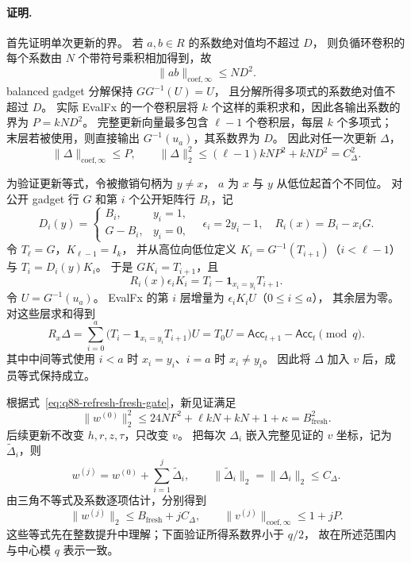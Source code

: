 \paragraph{证明.}
首先证明单次更新的界。
若 $a,b\in R$ 的系数绝对值均不超过 $D$，
则负循环卷积的每个系数由 $N$ 个带符号乘积相加得到，故
\[
 \|ab\|_{\mathrm{coef},\infty}\le ND^2.
\]
balanced gadget 分解保持 $GG^{-1}(U)=U$，
且分解所得多项式的系数绝对值不超过 $D$。
实际 EvalFx 的一个卷积层将 $k$ 个这样的乘积求和，因此各输出系数的界为
$P=kND^2$。
完整更新向量最多包含 $\ell-1$ 个卷积层，每层 $k$ 个多项式；
末层若被使用，则直接输出 $G^{-1}(u_a)$，其系数界为 $D$。
因此对任一次更新 $\Delta$，
\[
 \|\Delta\|_{\mathrm{coef},\infty}\le P,
 \qquad
 \|\Delta\|_2^2\le(\ell-1)kNP^2+kND^2=C_{\Delta}^2.
\]

为验证更新等式，令被撤销句柄为 $y\ne x$，
$a$ 为 $x$ 与 $y$ 从低位起首个不同位。
对公开 gadget 行 $G$ 和第 $i$ 个公开矩阵行 $B_i$，记
\[
 D_i(y)=\begin{cases}B_i,&y_i=1,\\G-B_i,&y_i=0,\end{cases}
 \quad \epsilon_i=2y_i-1,\quad R_i(x)=B_i-x_iG.
\]
令 $T_{\ell}=G$，$K_{\ell-1}=I_k$，
并从高位向低位定义
$K_i=G^{-1}(T_{i+1})$（$i<\ell-1$）与 $T_i=D_i(y)K_i$。
于是 $GK_i=T_{i+1}$，且
\[
 R_i(x)\epsilon_iK_i
 =T_i-\boldsymbol{1}_{x_i=y_i}T_{i+1}.
\]
令 $U=G^{-1}(u_a)$。
EvalFx 的第 $i$ 层增量为 $\epsilon_iK_iU$（$0\le i\le a$），
其余层为零。对这些层求和得到
\begin{equation}
 R_x\Delta
 =\sum_{i=0}^{a}
   \bigl(T_i-\boldsymbol{1}_{x_i=y_i}T_{i+1}\bigr)U
 =T_0U
 =\mathsf{Acc}_{t+1}-\mathsf{Acc}_t\pmod q.
 \label{eq:q88-refresh-update-identity}
\end{equation}
其中中间等式使用 $i<a$ 时 $x_i=y_i$、$i=a$ 时 $x_i\ne y_i$。
因此将 $\Delta$ 加入 $v$ 后，成员等式保持成立。

根据式~\eqref{eq:q88-refresh-fresh-gate}，新见证满足
\[
 \|w^{(0)}\|_2^2
 \le24NF^2+\ell kN+kN+1+\kappa
 =B_{\mathrm{fresh}}^2.
\]
后续更新不改变 $h,r,z,\tau$，只改变 $v$。
把每次 $\Delta_i$ 嵌入完整见证的 $v$ 坐标，记为
$\widetilde\Delta_i$，则
\[
 w^{(j)}=w^{(0)}+\sum_{i=1}^{j}\widetilde\Delta_i,
 \qquad \|\widetilde\Delta_i\|_2=\|\Delta_i\|_2\le C_{\Delta}.
\]
由三角不等式及系数逐项估计，分别得到
\[
 \|w^{(j)}\|_2\le B_{\mathrm{fresh}}+jC_{\Delta},
 \qquad
 \|v^{(j)}\|_{\mathrm{coef},\infty}\le1+jP.
\]
这些等式先在整数提升中理解；下面验证所得系数界小于 $q/2$，
故在所述范围内与中心模 $q$ 表示一致。


